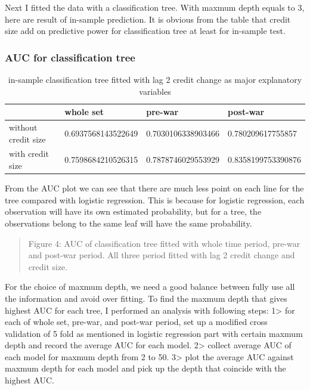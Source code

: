 \documentclass{article}
\newcommand{\ciapdf}[1]{\vspace*{-\parskip}\begin{center}\resizebox{0.75\textwidth}{!}{\texttt{[image: \#1]}}\end{center}}
\begin{document}
Next I fitted the data with a classification tree. With maxmum depth
equals to 3, here are result of in-sample prediction. It is obvious from
the table that credit size add on predictive power for classification
tree at least for in-sample test.

\subsubsection*{\centering{}AUC for classification tree}

\begin{table}[H]
    \caption{
    in-sample classification tree fitted with lag 2 credit change
    as major explanatory variables
    }
    \begin{center}\begin{tabular}{|l|l|l|l|}
    \hline
                        & whole set          & pre-war            & post-war           \\ \hline
    without credit size & 0.6937568143522649 & 0.7030106338903466 & 0.780209617755857  \\ \hline
    with credit size    & 0.7598684210526315 & 0.7878746029553929 & 0.8358199753390876 \\ \hline
    \end{tabular}\end{center}
\end{table}

From the AUC plot we can see that there are much less point on each line
for the tree compared with logistic regression. This is because for
logistic regression, each observation will have its own estimated
probability, but for a tree, the observations belong to the same leaf
will have the same probability.

\ciapdf{Figure_5.pdf}
\begin{quote}
Figure 4: AUC of classification tree fitted with whole time period,
pre-war and post-war period. All three period fitted with lag 2 credit
change and credit size.
\end{quote}

For the choice of maxmum depth, we need a good balance between fully use
all the information and avoid over fitting. To find the maxmum depth
that gives highest AUC for each tree, I performed an analysis with
following steps: 1\textgreater{} for each of whole set, pre-war, and
post-war period, set up a modified cross validation of 5 fold as
mentioned in logistic regression part with certain maxmum depth and
record the average AUC for each model. 2\textgreater{} collect average
AUC of each model for maxmum depth from 2 to 50. 3\textgreater{} plot
the average AUC against maxmum depth for each model and pick up the
depth that coincide with the highest AUC.
\end{document}
